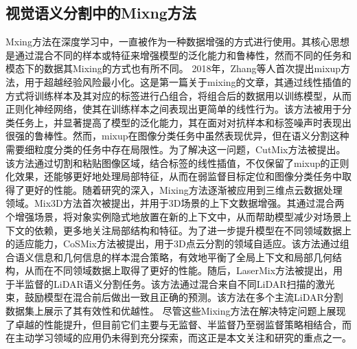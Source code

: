 \subsection{视觉语义分割中的Mixng方法}
Mxing方法在深度学习中，一直被作为一种数据增强的方式进行使用。其核心思想是通过混合不同的样本或特征来增强模型的泛化能力和鲁棒性，然而不同的任务和模态下的数据其Mixing的方式也有所不同。
2018年，Zhang等人首次提出mixup方法，用于超越经验风险最小化。这是第一篇关于mixing的文章，其通过线性插值的方式将训练样本及其对应的标签进行凸组合，将组合后的数据用以训练模型，从而正则化神经网络，使其在训练样本之间表现出更简单的线性行为。该方法被用于分类任务上，并显著提高了模型的泛化能力，其在面对对抗样本和标签噪声时表现出很强的鲁棒性。然而，mixup在图像分类任务中虽然表现优异，但在语义分割这种需要细粒度分类的任务中存在局限性。为了解决这一问题，CutMix方法被提出。该方法通过切割和粘贴图像区域，结合标签的线性插值，不仅保留了mixup的正则化效果，还能够更好地处理局部特征，从而在弱监督目标定位和图像分类任务中取得了更好的性能。随着研究的深入，Mixing方法逐渐被应用到三维点云数据处理领域。Mix3D方法首次被提出，并用于3D场景的上下文数据增强。其通过混合两个增强场景，将对象实例隐式地放置在新的上下文中，从而帮助模型减少对场景上下文的依赖，更多地关注局部结构和特征。为了进一步提升模型在不同领域数据上的适应能力，CoSMix方法被提出，用于3D点云分割的领域自适应。该方法通过组合语义信息和几何信息的样本混合策略，有效地平衡了全局上下文和局部几何结构，从而在不同领域数据上取得了更好的性能。随后，LaserMix方法被提出，用于半监督的LiDAR语义分割任务。该方法通过混合来自不同LiDAR扫描的激光束，鼓励模型在混合前后做出一致且正确的预测。该方法在多个主流LiDAR分割数据集上展示了其有效性和优越性。
尽管这些Mixing方法在解决特定问题上展现了卓越的性能提升，但目前它们主要与无监督、半监督乃至弱监督策略相结合，而在主动学习领域的应用仍未得到充分探索，而这正是本文关注和研究的重点之一。

